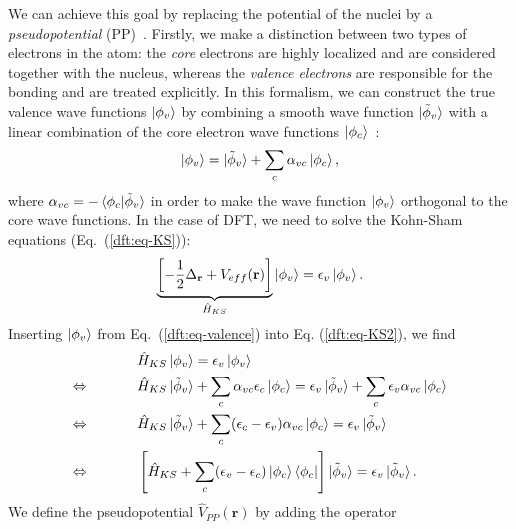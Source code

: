 \begin{refsection}
We can achieve this goal by replacing the potential of the nuclei by a 
\textit{pseudopotential} (PP)~\cite{Phillips1959}. Firstly, we make a 
distinction between two types of electrons in the atom: the \textit{core} 
electrons are highly localized and are considered together with the nucleus, 
whereas the \textit{valence electrons} are responsible for the bonding and are 
treated explicitly. In this formalism, we can construct the true valence wave 
functions $\ket{\phi_v}$ by combining a smooth wave function 
$\ket{\tilde{\phi}_v}$ with a linear combination of the core electron wave 
functions $\ket{\phi_c}$~\cite{Kohanoff2006}: 
\begin{equation} \label{dft:eq-valence}
\ket{\phi_v} = \ket{\tilde{\phi}_v} + \sum_c \alpha_{vc} \ket{\phi_c},  
\end{equation} 
where $\alpha_{vc} = - \braket{\phi_c | \tilde{\phi}_v}$ in order to make the 
wave function $\ket{\phi_v}$ orthogonal to the core wave functions. In the 
case of DFT, we need to solve the Kohn-Sham equations (Eq.~(\ref{dft:eq-KS})): 
\begin{equation}\label{dft:eq-KS2} 
\underbrace{\left[- \frac{1}{2} \Delta_{\mathbf{r}} + V_{eff}(\mathbf{r}) 
\right]}_{\hat{H}_{KS} } \ket{\phi_v} = \epsilon_v \ket{\phi_v}. 
\end{equation} 
Inserting $\ket{\phi_v}$ from Eq.~(\ref{dft:eq-valence}) into Eq. (\ref{dft:eq-KS2}), we find 
\begin{align*} 
&\hspace{0.5in}\hat{H}_{KS} \ket{\phi_v} = \epsilon_v \ket{\phi_v}  
\\ \Leftrightarrow &\hspace{0.5in} \hat{H}_{KS} \ket{\tilde{\phi}_v} + \sum_c 
\alpha_{vc} \epsilon_c \ket{\phi_c} = \epsilon_v \ket{\tilde{\phi}_v} +  
\sum_c \epsilon_v \alpha_{vc}  \ket{\phi_c} 
\\ \Leftrightarrow &\hspace{0.5in} \hat{H}_{KS} \ket{\tilde{\phi}_v} + \sum_c 
(\epsilon_c - \epsilon_v) \alpha_{vc}  \ket{\phi_c} = \epsilon_v 
\ket{\tilde{\phi}_v} 
\\ \Leftrightarrow &\hspace{0.5in} \left[ \hat{H}_{KS} + \sum_c (\epsilon_v - 
\epsilon_c) \ket{\phi_c} \bra{\phi_c} \right] \ket{\tilde{\phi}_v} = 
\epsilon_v \ket{\tilde{\phi}_v}. 
\end{align*} 
We define the pseudopotential $\hat{V}_{PP}(\mathbf{r})$ by adding the 
operator 
\begin{equation*} 

\end{equation*}
\end{refsection}
